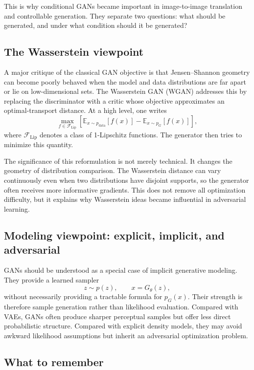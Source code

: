 This is why conditional GANs became important in image-to-image translation and controllable generation.
They separate two questions:
what should be generated, and under what condition should it be generated?

\subsection*{The Wasserstein viewpoint}

A major critique of the classical GAN objective is that Jensen--Shannon geometry can become poorly behaved when the model and data distributions are far apart or lie on low-dimensional sets.
The Wasserstein GAN (WGAN) addresses this by replacing the discriminator with a critic whose objective approximates an optimal-transport distance.
At a high level, one writes
\[
\max_{f\in \mathcal F_{\mathrm{Lip}}}
\left[
\mathbb E_{x\sim p_{\mathrm{data}}}[f(x)] - \mathbb E_{x\sim p_G}[f(x)]
\right],
\]
where $\mathcal F_{\mathrm{Lip}}$ denotes a class of 1-Lipschitz functions.
The generator then tries to minimize this quantity.

The significance of this reformulation is not merely technical.
It changes the geometry of distribution comparison.
The Wasserstein distance can vary continuously even when two distributions have disjoint supports, so the generator often receives more informative gradients.
This does not remove all optimization difficulty, but it explains why Wasserstein ideas became influential in adversarial learning.

\subsection*{Modeling viewpoint: explicit, implicit, and adversarial}

GANs should be understood as a special case of implicit generative modeling.
They provide a learned sampler
\[
z\sim p(z), \qquad x=G_\theta(z),
\]
without necessarily providing a tractable formula for $p_G(x)$.
Their strength is therefore sample generation rather than likelihood evaluation.
Compared with VAEs, GANs often produce sharper perceptual samples but offer less direct probabilistic structure.
Compared with explicit density models, they may avoid awkward likelihood assumptions but inherit an adversarial optimization problem.

\subsection*{What to remember}


